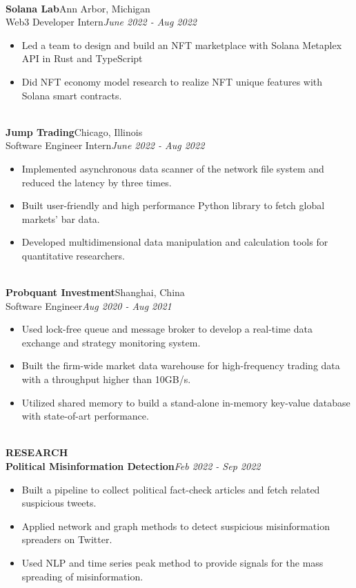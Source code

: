 \documentclass[10pt,a4paper]{article}
\begin{document}
\noindent\\
\textbf{Solana Lab}\hfill Ann Arbor, Michigan\\
Web3 Developer Intern\hfill\emph{June 2022 - Aug 2022}
\begin{itemize}[noitemsep,topsep=0pt]
    \item Led a team to design and build an NFT marketplace with Solana Metaplex API in Rust and TypeScript
    \item Did NFT economy model research to realize NFT unique features with Solana smart contracts.
\end{itemize}
\noindent\\
\textbf{Jump Trading}\hfill Chicago, Illinois\\
Software Engineer Intern\hfill\emph{June 2022 - Aug 2022}
\begin{itemize}[noitemsep,topsep=0pt]
    \item Implemented asynchronous data scanner of the network file system and reduced the latency by three times.
    \item Built user-friendly and high performance Python library to fetch global markets' bar data. 
    \item Developed multidimensional data manipulation and calculation tools for quantitative researchers.
\end{itemize}
\noindent\\
\textbf{Probquant Investment}\hfill Shanghai, China\\
Software Engineer\hfill\emph{Aug 2020 - Aug 2021}
\begin{itemize}[noitemsep,topsep=0pt]
    \item Used lock-free queue and message broker to develop a real-time data exchange and strategy monitoring system.
    \item Built the firm-wide market data warehouse for high-frequency trading data with a throughput higher than 10GB/s.
    \item Utilized shared memory to build a stand-alone in-memory key-value database with state-of-art performance.
\end{itemize}
\noindent\\
\rlap{\rule[-1mm]{\linewidth}{.5mm}}\textbf{\large{RESEARCH}}\\
\textbf{Political Misinformation Detection}\hfill \emph{Feb 2022 - Sep 2022}
\begin{itemize}[noitemsep,topsep=0pt]
\item Built a pipeline to collect political fact-check articles and fetch related suspicious tweets.
\item Applied network and graph methods to detect suspicious misinformation spreaders on Twitter.
\item Used NLP and time series peak method to provide signals for the mass spreading of misinformation.\\
\end{itemize}
\end{document}
